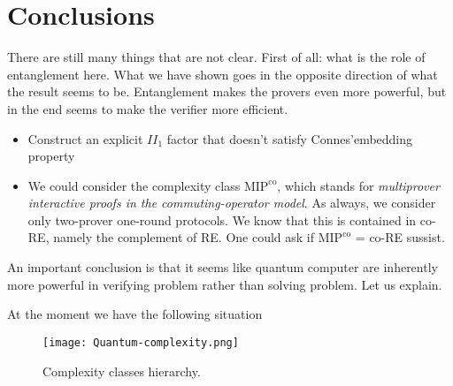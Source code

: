 \section*{Conclusions}

There are still many things that are not clear. First of all: what is the role of entanglement here. What we have shown goes in the opposite direction of what the result seems to be. Entanglement makes the provers even more powerful, but in the end seems to make the verifier more efficient.
\begin{itemize}

    \item Construct an explicit $II_1$ factor that doesn't satisfy Connes'embedding property
    \item We could consider the complexity class $\text{MIP}^\text{co}$, which stands for \emph{multiprover interactive proofs in the commuting-operator model}. As always, we consider only two-prover one-round protocols. We know that this is contained in co-RE, namely the complement of RE. One could ask if $\text{MIP}^\text{co}$ = co-RE sussist.
    
\end{itemize}

An important conclusion is that it seems like quantum computer are inherently more powerful in verifying problem rather than solving problem. Let us explain.

At the moment we have the following situation

\begin{figure}[htb]
    \texttt{[image: Quantum-complexity.png]}
    \centering
    \caption{Complexity classes hierarchy.}
    \end{figure}